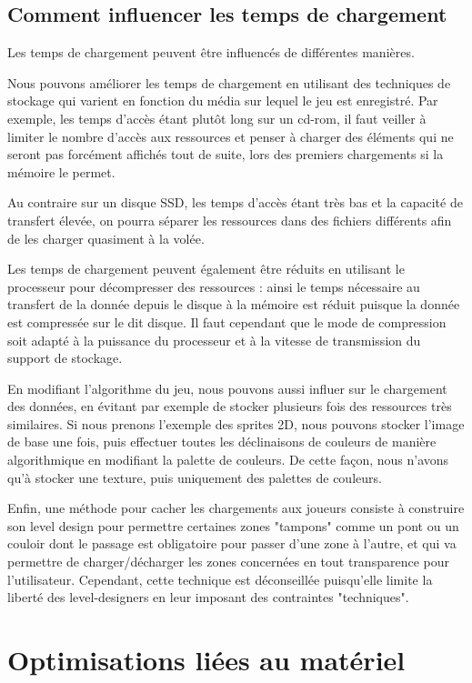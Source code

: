 \documentclass[a4paper, 12pt]{article} %
\begin{document}
\subsection[Comment les influencer]{Comment influencer les temps de chargement}
Les temps de chargement peuvent être influencés de différentes manières.

Nous pouvons améliorer les temps de chargement en utilisant des techniques de stockage qui varient en fonction du média sur lequel le jeu est enregistré. Par exemple, les temps d'accès étant plutôt long sur un cd-rom, il faut veiller à limiter le nombre d'accès aux ressources et penser à charger des éléments qui ne seront pas forcément affichés tout de suite, lors des premiers chargements si la mémoire le permet.

Au contraire sur un disque SSD, les temps d'accès étant très bas et la capacité de transfert élevée, on pourra séparer les ressources dans des fichiers différents afin de les charger quasiment à la volée.

Les temps de chargement peuvent également être réduits en utilisant le processeur pour décompresser des ressources : ainsi le temps nécessaire au transfert de la donnée depuis le disque à la mémoire est réduit puisque la donnée est compressée sur le dit disque. Il faut cependant que le mode de compression soit adapté à la puissance du processeur et à la vitesse de transmission du support de stockage.

En modifiant l'algorithme du jeu, nous pouvons aussi influer sur le chargement des données, en évitant par exemple de stocker plusieurs fois des ressources très similaires. Si nous prenons l'exemple des sprites 2D, nous pouvons stocker l'image de base une fois, puis effectuer toutes les déclinaisons de couleurs de manière algorithmique en modifiant la palette de couleurs. De cette façon, nous n'avons qu'à stocker une texture, puis uniquement des palettes de couleurs.

Enfin, une méthode pour cacher les chargements aux joueurs consiste à construire son level design pour permettre certaines zones "tampons" comme un pont ou un couloir dont le passage est obligatoire pour passer d'une zone à l'autre, et qui va permettre de charger/décharger les zones concernées en tout transparence pour l'utilisateur. Cependant, cette technique est déconseillée puisqu'elle limite la liberté des level-designers en leur imposant des contraintes "techniques".

\newpage
\section{Optimisations liées au matériel}
\end{document}
